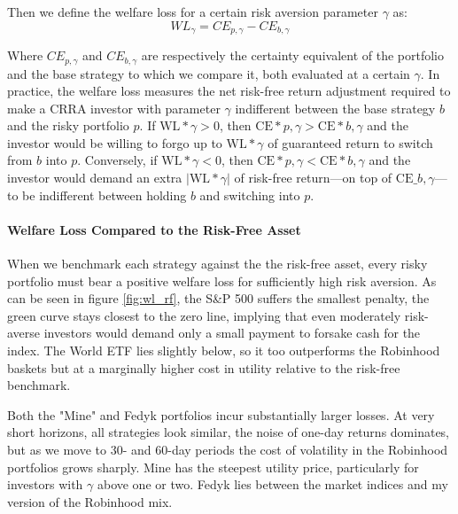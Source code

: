 Then we define the welfare loss for a certain risk aversion parameter $\gamma$ as:
\begin{equation}
    WL_{\gamma} = CE_{p, \gamma} - CE_{b, \gamma}
\end{equation}

Where $CE_{p, \gamma}$ and $CE_{b, \gamma}$ are respectively the certainty equivalent of the portfolio and the base strategy to which we compare it, both evaluated at a certain $\gamma$.
In practice, the welfare loss measures the net risk-free return adjustment required to make a CRRA investor with parameter $\gamma$ indifferent between the base strategy $b$ and the risky portfolio $p$. 
If $\mathrm{WL}*\gamma > 0$, then $\mathrm{CE}*{p,\gamma} > \mathrm{CE}*{b,\gamma}$ and the investor would be willing to forgo up to $\mathrm{WL}*\gamma$ of guaranteed return to switch from $b$ into $p$. 
Conversely, if $\mathrm{WL}*\gamma < 0$, then $\mathrm{CE}*{p,\gamma} < \mathrm{CE}*{b,\gamma}$ and the investor would demand an extra $|\mathrm{WL}*\gamma|$ of risk-free return—on top of $\mathrm{CE}\_{b,\gamma}$—to be indifferent between holding $b$ and switching into $p$.



\paragraph{Welfare Loss Compared to the Risk-Free Asset}
When we benchmark each strategy against the the risk-free asset, every risky portfolio must bear a positive welfare loss for sufficiently high risk aversion. 
As can be seen in figure \ref{fig:wl_rf}, the S\&P 500 suffers the smallest penalty, the green curve stays closest to the zero line, implying that even moderately risk-averse investors would demand only a small payment to forsake cash for the index. 
The World ETF lies slightly below, so it too outperforms the Robinhood baskets but at a marginally higher cost in utility relative to the risk-free benchmark.

Both the "Mine" and Fedyk portfolios incur substantially larger losses.
At very short horizons, all strategies look similar, the noise of one-day returns dominates, but as we move to 30- and 60-day periods the cost of volatility in the Robinhood portfolios grows sharply. 
Mine has the steepest utility price, particularly for investors with $\gamma$ above one or two. 
Fedyk lies between the market indices and my version of the Robinhood mix.

